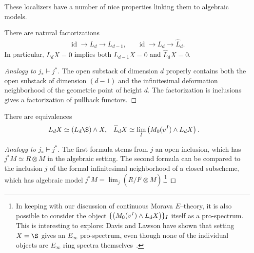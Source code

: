 These localizers have a number of nice properties linking them to algebraic models.

\begin{lemma}
There are natural factorizations
\begin{align*}
\operatorname{id} \to L_d \to L_{d-1}, & & \operatorname{id} \to L_d \to \widehat L_d.
\end{align*}
In particular, $L_d X = 0$ implies both $L_{d-1} X = 0$ and $\widehat L_d X = 0$.
\end{lemma}
\begin{proof}[Analogy to $j_* \vdash j^*$]
The open substack of dimension $d$ properly contains both the open substack of dimension $(d-1)$ and the infinitesimal deformation neighborhood of the geometric point of height $d$.  The factorization is inclusions gives a factorization of pullback functors.
\end{proof}

\begin{lemma}\label{FormulaForKnLocalization}
There are equivalences
\begin{align*}
L_d X & \simeq (L_d \S) \sm X, &
\widehat L_d X & \simeq \lim_I \left( M_0(v^I) \sm L_d X \right).
\end{align*}
\end{lemma}
\begin{proof}[Analogy to $j_* \vdash j^*$]
The first formula stems from $j$ an open inclusion, which has $j^* M \simeq R \otimes M$ in the algebraic setting.  The second formula can be compared to the inclusion $j$ of the formal infinitesimal neighborhood of a closed subscheme, which has algebraic model $j^* M = \lim_j (R/I^j \otimes M)$.\footnote{In keeping with our discussion of continuous Morava $E$--theory, it is also possible to consider the object $\{\left( M_0(v^I) \wedge L_d X \right)\}_I$ itself as a pro-spectrum.  This is interesting to explore: Davis and Lawson have shown that setting $X = \S$ gives an $E_\infty$ pro-spectrum, even though none of the individual objects are $E_\infty$ ring spectra themselves~\cite{DavisLawson}.}
\end{proof}

